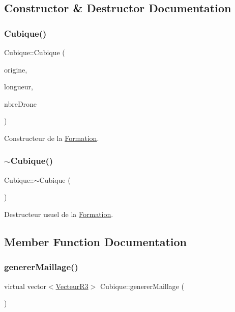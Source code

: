 \subsection{Constructor \& Destructor Documentation}
\mbox{\label{class_cubique_ae437848fa7a382f250cf84d9b5c35154}} 
\subsubsection{\texorpdfstring{Cubique()}{Cubique()}}
{\footnotesize\ttfamily Cubique\+::\+Cubique (\begin{DoxyParamCaption}\item[{\mbox{\hyperlink{class_vecteur_r3}{Vecteur\+R3}}}]{origine,  }\item[{float}]{longueur,  }\item[{int}]{nbre\+Drone }\end{DoxyParamCaption})}

Constructeur de la \mbox{\hyperlink{class_formation}{Formation}}. \mbox{\label{class_cubique_a5880f332af7c4f412b74ae9a6a71909a}} 
\subsubsection{\texorpdfstring{$\sim$\+Cubique()}{~Cubique()}}
{\footnotesize\ttfamily Cubique\+::$\sim$\+Cubique (\begin{DoxyParamCaption}{ }\end{DoxyParamCaption})\hspace{0.3cm}{\ttfamily [virtual]}}

Destructeur usuel de la \mbox{\hyperlink{class_formation}{Formation}}. 

\subsection{Member Function Documentation}
\mbox{\label{class_cubique_a9a3988f05aa6bacdf2cc660fef17138e}} 
\subsubsection{\texorpdfstring{generer\+Maillage()}{genererMaillage()}}
{\footnotesize\ttfamily virtual vector$<$\mbox{\hyperlink{class_vecteur_r3}{Vecteur\+R3}}$>$ Cubique\+::generer\+Maillage (\begin{DoxyParamCaption}{ }\end{DoxyParamCaption})\hspace{0.3cm}{\ttfamily [virtual]}}


